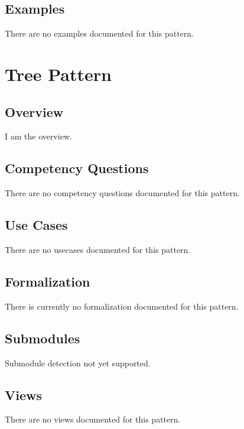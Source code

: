 \subsection{Examples}
\label{ssec:examples}
There are no examples documented for this pattern.


\section{Tree Pattern}
\label{sec:tree-pattern}
\subsection{Overview}
\label{ssec:overview}
I am the overview.

\subsection{Competency Questions}
\label{ssec:cqs}
There are no competency questions documented for this pattern.

\subsection{Use Cases}
\label{ssec:use-cases}
There are no usecases documented for this pattern.
\subsection{Formalization}
\label{ssec:formalization}
There is currently no formalization documented for this pattern.

\subsection{Submodules}
\label{ssec:submodules}
Submodule detection not yet supported.

\subsection{Views}
\label{ssec:views}
There are no views documented for this pattern.


